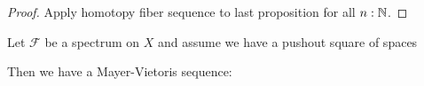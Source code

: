 \begin{proof}
  Apply homotopy fiber sequence to last proposition for all $n:\mathbb{N}$.
\end{proof}

\begin{lemma}
  \label{mayer-vietoris-sequence}
  Let $\mathcal F$ be a spectrum on $X$ and assume we have a pushout square of spaces
  \begin{center}
  \end{center}
  Then we have a Mayer-Vietoris sequence:
  \begin{center}
  \end{center}
\end{lemma}
 
